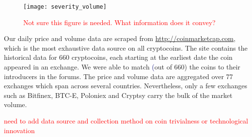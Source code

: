 \begin{figure}
\texttt{[image: severity\_volume]}
\caption{\textcolor{red}{Not sure this figure is needed. What information does it convey?}}
\end{figure}
Our daily price and volume data are scraped from \url{http://coinmarketcap.com}, which is the most exhaustive data source on all cryptocoins. The site contains the historical data for 660 cryptocoins, each starting at the earliest date the coin appeared in an exchange. We were able to match \textcolor{376} (out of 660) the coins to their introducers in the forums. The price and volume data are aggregated over 77 exchanges which span across several countries. Nevertheless, only a few exchanges such as Bitfinex, BTC-E, Poloniex and Cryptsy carry the bulk of the market volume.

\textcolor{red}{need to add data source and collection method on coin trivialness or technological innovation}


